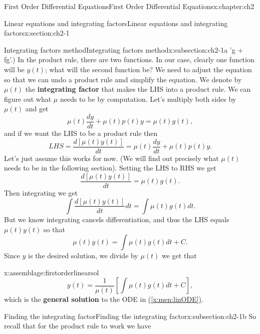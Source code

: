 \documentclass[oneside,10pt,]{book}
\newcommand{\terminology}[1]{\textbf{#1}}
\numberwithin{equation}{section}
\numberwithin{equation}{section}
\begin{document}
\begin{chapterptx}{First Order Differential Equations}{}{First Order Differential Equations}{}{}{x:chapter:ch2}
\begin{sectionptx}{Linear equations and integrating factors}{}{Linear equations and integrating factors}{}{}{x:section:ch2-1}
\begin{subsectionptx}{Integrating factors method}{}{Integrating factors method}{}{}{x:subsection:ch2-1a}
'g + fg'\).) In the product rule, there are two functions. In our case, clearly one function will be \(y(t)\); what will the second function be? We need to adjust the equation so that we can undo a product rule amd simplify the equation. We denote by \(\mu(t)\) the \terminology{integrating factor} that makes the LHS into a product rule. We can figure out what \(\mu\) needs to be by computation. Let's multiply both sides by \(\mu(t)\) and get%
\begin{equation*}
\mu(t)\frac{dy}{dt}+\mu(t)p(t)y=\mu(t)g(t),
\end{equation*}
and if we want the LHS to be a product rule then%
\begin{equation*}
LHS=\frac{d\left[\mu(t)y(t)\right]}{dt}=\mu(t)\frac{dy}{dt}+\mu(t)p(t)y.
\end{equation*}
Let's just assume this works for now. (We will find out precisely what \(\mu(t)\) needs to be in the following section). Setting the LHS to RHS we get%
\begin{equation*}
\frac{d\left[\mu(t)y(t)\right]}{dt}=\mu(t)g(t).
\end{equation*}
Then integrating we get%
\begin{equation*}
\int\frac{d\left[\mu(t)y(t)\right]}{dt}dt=\int\mu(t)g(t)dt.
\end{equation*}
But we know integrating cancels differentiation, and thus the LHS equals \(\mu(t)y(t)\) so that%
\begin{equation*}
\mu(t)y(t)=\int\mu(t)g(t)dt+C.
\end{equation*}
Since \(y\) is the desired solution, we divide by \(\mu(t)\) we get that \begin{assemblage}{}{x:assemblage:firstorderlinearsol}%
%
\begin{equation*}
y(t)=\frac{1}{\mu(t)}\left[\int\mu(t)g(t)dt+C\right],
\end{equation*}
which is the \terminology{general solution} to the ODE in \hyperref[x:men:linODE]{(\ref{x:men:linODE})}.%
\end{assemblage}
\end{subsectionptx}
%
%
\typeout{************************************************}
\typeout{************************************************}
%
\begin{subsectionptx}{Finding the integrating factor}{}{Finding the integrating factor}{}{}{x:subsection:ch2-1b}
So recall that for the product rule to work we have%
\begin{equation*}

\end{equation*}
\end{subsectionptx}
\end{sectionptx}
\end{chapterptx}
\end{document}
